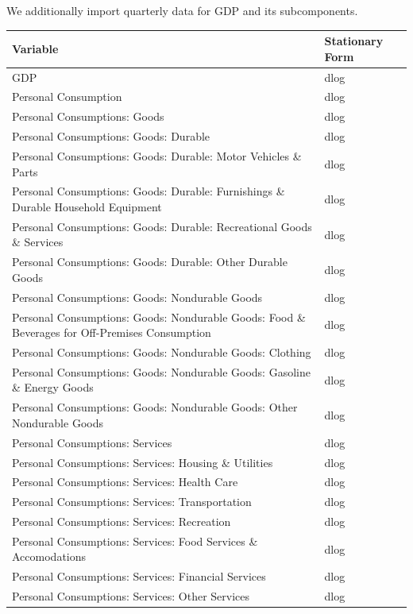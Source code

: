 \documentclass[11pt, letterpaper]{article}\usepackage[]{graphicx}\usepackage[]{color}
\begin{document}
We additionally import quarterly data for GDP and its subcomponents.
\begin{table}[!h]
\centering
\begingroup\scriptsize
\begin{tabular}{ll}
  \hline
Variable & Stationary Form \\ 
  \hline
GDP & dlog \\ 
  Personal Consumption & dlog \\ 
  Personal Consumptions: Goods & dlog \\ 
  Personal Consumptions: Goods: Durable & dlog \\ 
  Personal Consumptions: Goods: Durable: Motor Vehicles \& Parts & dlog \\ 
  Personal Consumptions: Goods: Durable: Furnishings \& Durable Household Equipment & dlog \\ 
  Personal Consumptions: Goods: Durable: Recreational Goods \& Services & dlog \\ 
  Personal Consumptions: Goods: Durable: Other Durable Goods & dlog \\ 
  Personal Consumptions: Goods: Nondurable Goods & dlog \\ 
  Personal Consumptions: Goods: Nondurable Goods: Food \& Beverages for Off-Premises Consumption & dlog \\ 
  Personal Consumptions: Goods: Nondurable Goods: Clothing & dlog \\ 
  Personal Consumptions: Goods: Nondurable Goods: Gasoline \& Energy Goods & dlog \\ 
  Personal Consumptions: Goods: Nondurable Goods: Other Nondurable Goods & dlog \\ 
  Personal Consumptions: Services & dlog \\ 
  Personal Consumptions: Services: Housing \& Utilities & dlog \\ 
  Personal Consumptions: Services: Health Care & dlog \\ 
  Personal Consumptions: Services: Transportation & dlog \\ 
  Personal Consumptions: Services: Recreation & dlog \\ 
  Personal Consumptions: Services: Food Services \& Accomodations & dlog \\ 
  Personal Consumptions: Services: Financial Services & dlog \\ 
  Personal Consumptions: Services: Other Services & dlog \\ 

\end{tabular}
\end{table}
\end{document}
